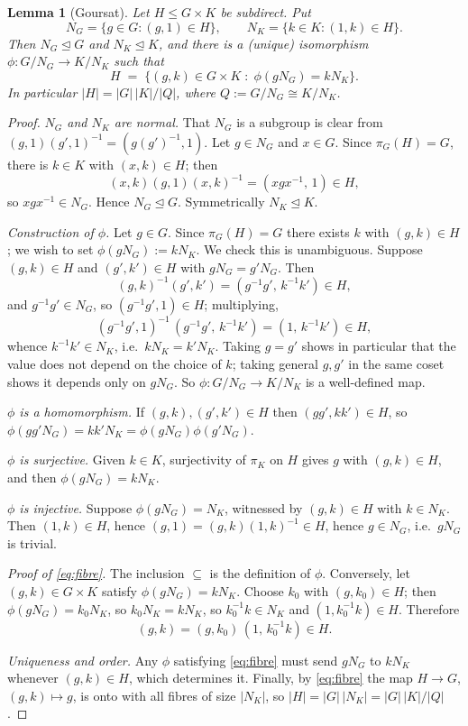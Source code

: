 \documentclass[11pt]{article}
\theoremstyle{plain}
\newtheorem{lemma}[theorem]{Lemma}
\theoremstyle{definition}
\theoremstyle{remark}
\numberwithin{equation}{section}
\newcommand{\normal}{\trianglelefteq}
\begin{document}
\begin{lemma}[Goursat]
\label{lem:goursat}
Let $H \le G \times K$ be subdirect. Put
\[
N_G = \{g \in G : (g,1) \in H\}, \qquad N_K = \{k \in K : (1,k) \in H\}.
\]
Then $N_G \normal G$ and $N_K \normal K$, and there is a (unique) isomorphism
$\phi : G/N_G \to K/N_K$ such that
\begin{equation}
\label{eq:fibre}
H \;=\; \bigl\{(g,k) \in G\times K \;:\; \phi(gN_G) = kN_K \bigr\}.
\end{equation}
In particular $|H| = |G|\,|K| / |Q|$, where $Q := G/N_G \cong K/N_K$.
\end{lemma}

\begin{proof}
\emph{$N_G$ and $N_K$ are normal.} That $N_G$ is a subgroup is clear from
$(g,1)(g',1)^{-1} = (g(g')^{-1},1)$. Let $g \in N_G$ and $x \in G$. Since $\pi_G(H) = G$, there
is $k \in K$ with $(x,k) \in H$; then
\[
(x,k)(g,1)(x,k)^{-1} = (xgx^{-1},\,1) \in H,
\]
so $xgx^{-1} \in N_G$. Hence $N_G \normal G$. Symmetrically $N_K \normal K$.

\emph{Construction of $\phi$.} Let $g \in G$. Since $\pi_G(H) = G$ there exists $k$ with
$(g,k) \in H$; we wish to set $\phi(gN_G) := kN_K$. We check this is unambiguous. Suppose
$(g,k) \in H$ and $(g',k') \in H$ with $gN_G = g'N_G$. Then
\[
(g,k)^{-1}(g',k') = (g^{-1}g',\, k^{-1}k') \in H,
\]
and $g^{-1}g' \in N_G$, so $(g^{-1}g',1) \in H$; multiplying,
\[
(g^{-1}g',1)^{-1}\,(g^{-1}g',\,k^{-1}k') = (1,\,k^{-1}k') \in H,
\]
whence $k^{-1}k' \in N_K$, i.e.\ $kN_K = k'N_K$. Taking $g = g'$ shows in particular that the
value does not depend on the choice of $k$; taking general $g,g'$ in the same coset shows it
depends only on $gN_G$. So $\phi : G/N_G \to K/N_K$ is a well-defined map.

\emph{$\phi$ is a homomorphism.} If $(g,k),(g',k') \in H$ then $(gg',kk') \in H$, so
$\phi(gg'N_G) = kk'N_K = \phi(gN_G)\phi(g'N_G)$.

\emph{$\phi$ is surjective.} Given $k \in K$, surjectivity of $\pi_K$ on $H$ gives $g$ with
$(g,k) \in H$, and then $\phi(gN_G) = kN_K$.

\emph{$\phi$ is injective.} Suppose $\phi(gN_G) = N_K$, witnessed by $(g,k) \in H$ with
$k \in N_K$. Then $(1,k) \in H$, hence $(g,1) = (g,k)(1,k)^{-1} \in H$, hence $g \in N_G$, i.e.\
$gN_G$ is trivial.

\emph{Proof of \eqref{eq:fibre}.} The inclusion $\subseteq$ is the definition of $\phi$.
Conversely, let $(g,k) \in G\times K$ satisfy $\phi(gN_G) = kN_K$. Choose $k_0$ with
$(g,k_0) \in H$; then $\phi(gN_G) = k_0N_K$, so $k_0N_K = kN_K$, so $k_0^{-1}k \in N_K$ and
$(1,k_0^{-1}k) \in H$. Therefore
\[
(g,k) = (g,k_0)\,(1,\,k_0^{-1}k) \in H .
\]

\emph{Uniqueness and order.} Any $\phi$ satisfying \eqref{eq:fibre} must send $gN_G$ to $kN_K$
whenever $(g,k) \in H$, which determines it. Finally, by \eqref{eq:fibre} the map
$H \to G$, $(g,k)\mapsto g$, is onto with all fibres of size $|N_K|$, so
$|H| = |G|\,|N_K| = |G|\,|K|/|Q|$.
\end{proof}
\end{document}
